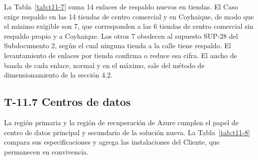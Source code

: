 \documentclass[11pt]{article}
\begin{document}
La Tabla~\mbox{\ref{tab:t11-7}} suma 14 enlaces de respaldo nuevos en tiendas. El Caso exige respaldo en las 14 tiendas de centro comercial y en Coyhaique, de modo que el mínimo exigible son 7, que corresponden a las 6 tiendas de centro comercial sin respaldo propio y a Coyhaique. Los otros 7 obedecen al supuesto SUP-28 del Subdocumento 2, según el cual ninguna tienda a la calle tiene respaldo. El levantamiento de enlaces por tienda confirma o reduce esa cifra. El ancho de banda de cada enlace, normal y en el máximo, sale del método de dimensionamiento de la sección 4.2.

\subsection{T-11.7 Centros de datos}\label{t-11-7}

La región primaria y la región de recuperación de Azure cumplen el papel de centro de datos principal y secundario de la solución nueva. La Tabla~\mbox{\ref{tab:t11-8}} compara sus especificaciones y agrega las instalaciones del Cliente, que permanecen en convivencia.
\end{document}
